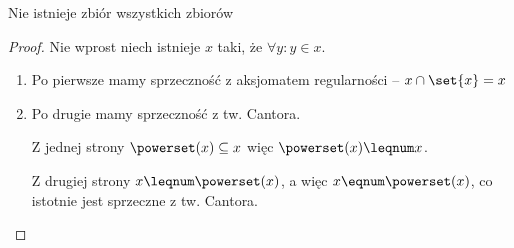 \begin{theorem}
	Nie istnieje zbiór wszystkich zbiorów
\end{theorem}
\begin{proof}
	Nie wprost niech istnieje \( x \) taki, że \( \forall y: y \in x \).
	\begin{enumerate}
		\item Po pierwsze mamy sprzeczność z aksjomatem regularności -- \( x \cap \set{x} = x \)
		\item Po drugie mamy sprzeczność z tw. Cantora.

		      Z jednej strony \( \powerset(x) \subseteq x \) więc \( \powerset(x) \leqnum x \).

		      Z drugiej strony \( x \leqnum \powerset(x) \), a więc \( x \eqnum \powerset(x) \), co istotnie jest sprzeczne z tw. Cantora.
	\end{enumerate}
\end{proof}